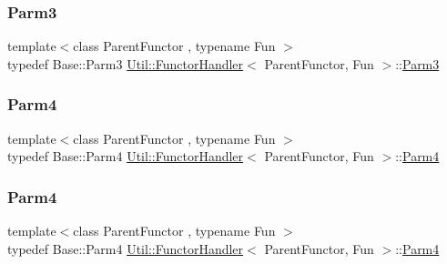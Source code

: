 \mbox{\label{classUtil_1_1FunctorHandler_a25f1b9dd7890c1dbc68abc686f30bec8}} 
\subsubsection{\texorpdfstring{Parm3}{Parm3}\hspace{0.1cm}{\footnotesize\ttfamily [3/3]}}
{\footnotesize\ttfamily template$<$class Parent\+Functor , typename Fun $>$ \\
typedef Base\+::\+Parm3 \mbox{\hyperlink{classUtil_1_1FunctorHandler}{Util\+::\+Functor\+Handler}}$<$ Parent\+Functor, Fun $>$\+::\mbox{\hyperlink{classUtil_1_1FunctorHandler_a25f1b9dd7890c1dbc68abc686f30bec8}{Parm3}}}

\mbox{\label{classUtil_1_1FunctorHandler_a2e8ca7556b379684e9b76029e77dd644}} 
\subsubsection{\texorpdfstring{Parm4}{Parm4}\hspace{0.1cm}{\footnotesize\ttfamily [1/3]}}
{\footnotesize\ttfamily template$<$class Parent\+Functor , typename Fun $>$ \\
typedef Base\+::\+Parm4 \mbox{\hyperlink{classUtil_1_1FunctorHandler}{Util\+::\+Functor\+Handler}}$<$ Parent\+Functor, Fun $>$\+::\mbox{\hyperlink{classUtil_1_1FunctorHandler_a2e8ca7556b379684e9b76029e77dd644}{Parm4}}}

\mbox{\label{classUtil_1_1FunctorHandler_a2e8ca7556b379684e9b76029e77dd644}} 
\subsubsection{\texorpdfstring{Parm4}{Parm4}\hspace{0.1cm}{\footnotesize\ttfamily [2/3]}}
{\footnotesize\ttfamily template$<$class Parent\+Functor , typename Fun $>$ \\
typedef Base\+::\+Parm4 \mbox{\hyperlink{classUtil_1_1FunctorHandler}{Util\+::\+Functor\+Handler}}$<$ Parent\+Functor, Fun $>$\+::\mbox{\hyperlink{classUtil_1_1FunctorHandler_a2e8ca7556b379684e9b76029e77dd644}{Parm4}}}

